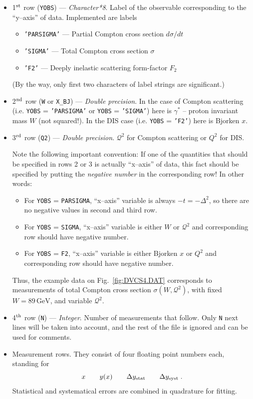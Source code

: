 \documentclass[12pt]{article}
\newcounter{comment}
\begin{document}
\begin{itemize}
\item 
1$^{\rm st}$ row (\texttt{YOBS}) --- \emph{Character*8}. Label of the observable
corresponding to the ``y--axis'' of data. Implemented are labels
  \begin{itemize}
  \item \texttt{'PARSIGMA'} --- Partial Compton cross section $d\sigma/d t$  
  \item \texttt{'SIGMA'} --- Total Compton cross section $\sigma$  
  \item \texttt{'F2'} --- Deeply inelastic scattering form-factor $F_2$  
  \end{itemize} 
(By the way, only first two characters of label strings are significant.)


\item 
2$^{\rm nd}$ row (\texttt{W} or \texttt{X\_BJ}) --- \emph{Double precision}.
In the case of Compton scattering (i.e. \texttt{YOBS} = \texttt{'PARSIGMA'} or
\texttt{YOBS} = \texttt{'SIGMA'}) here is $\gamma^*$ -- proton invariant mass
$W$ (not squared!). In the DIS case (i.e. \texttt{YOBS} = \texttt{'F2'})
here is Bjorken $x$.

\item 
3$^{\rm rd}$ row (\texttt{Q2}) --- \emph{Double precision}. $\mathcal{Q}^2$
for Compton scattering or $Q^2$ for DIS.

Note the following important convention: If one of the quantities that should
be specified in rows 2 or 3 is actually ``x--axis'' of data, this fact
should be specified by putting the \emph{negative number} in the corresponding row!
In other words:
\begin{itemize}
\item 
For \texttt{YOBS} = \texttt{PARSIGMA}, ``x--axis'' variable is 
always $-t = - \Delta^2$, so there are no negative values in second
and third row.
\item 
For \texttt{YOBS} = \texttt{SIGMA}, ``x--axis'' variable is 
either $W$ or $\mathcal{Q}^2$ and corresponding row should have negative number.
\item 
For \texttt{YOBS} = \texttt{F2}, ``x--axis'' variable is 
either Bjorken $x$ or $Q^2$ and corresponding row should have negative number.
\end{itemize}
Thus, the example data on Fig.~\ref{fig:DVCS4.DAT} corresponds to
measurements of total Compton cross section $\sigma(W, \mathcal{Q}^2)$, with
fixed $W = 89\, \textrm{GeV}$, and variable $\mathcal{Q}^2$.

\item 
4$^{\rm th}$ row (\texttt{N}) --- \emph{Integer}. Number of measurements that
follow. Only \texttt{N} next lines will be taken into account, and the
rest of the file is ignored and can be used for comments.

\item
Measurement rows. They consist of four floating point numbers each,
standing for 
\[
 x \qquad y(x) \qquad \Delta y_{\rm stat} \qquad
\Delta y_{\rm syst} \;.
\]
Statistical and systematical errors are combined in quadrature for fitting.

\end{itemize}
\end{document}
